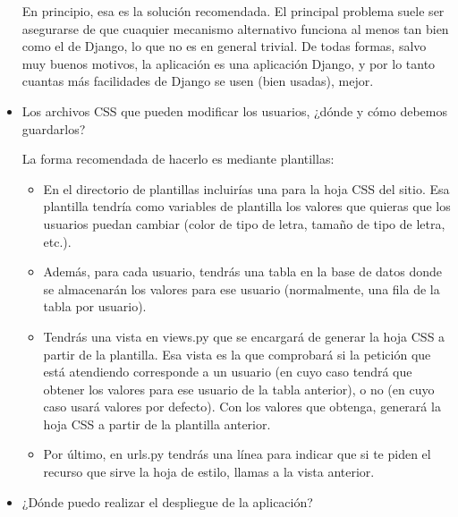\begin{itemize}
  En principio, esa es la solución recomendada. El principal problema suele ser asegurarse de que cuaquier mecanismo alternativo funciona al menos tan bien como el de Django, lo que no es en general trivial. De todas formas, salvo muy buenos motivos, la aplicación es una aplicación Django, y por lo tanto cuantas más facilidades de Django se usen (bien usadas), mejor.

\item Los archivos CSS que pueden modificar los usuarios, ¿dónde y cómo debemos guardarlos?

  La forma recomendada de hacerlo es mediante plantillas:

  \begin{itemize}
  \item En el directorio de plantillas incluirías una para la hoja CSS del sitio. Esa plantilla tendría como variables de plantilla los valores que quieras que los usuarios puedan cambiar (color de tipo de letra, tamaño de tipo de letra, etc.).
  \item Además, para cada usuario, tendrás una tabla en la base de datos donde se almacenarán los valores para ese usuario (normalmente, una fila de la tabla por usuario).
  \item Tendrás una vista en views.py que se encargará de generar la hoja CSS a partir de la plantilla. Esa vista es la que comprobará si la petición que está atendiendo corresponde a un usuario (en cuyo caso tendrá que obtener los valores para ese usuario de la tabla anterior), o no (en cuyo caso usará valores por defecto). Con los valores que obtenga, generará la hoja CSS a partir de la plantilla anterior.
  \item Por último, en urls.py tendrás una línea para indicar que si te piden el recurso que sirve la hoja de estilo, llamas a la vista anterior.
  \end{itemize}

\item ¿Dónde puedo realizar el despliegue de la aplicación?


\end{itemize}
